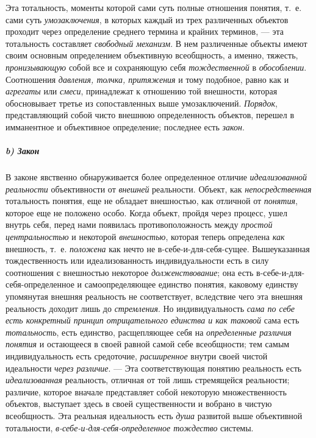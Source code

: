 \documentclass[twoside]{article}
\begin{document}
{{{Эта тотальность, моменты которой сами суть полные отношения
понятия, т.~е. сами суть
{\em умозаключения}, в
которых каждый из трех различенных объектов проходит через определение
среднего термина и крайних терминов, — эта тотальность
составляет {\em свободный механизм}.
В нем различенные объекты имеют своим основным определением
объективную всеобщность, а именно, тяжесть,
{\em пронизывающую} собой
все и сохраняющую себя
{\em тождественной} в
{\em обособлении}.
Соотношения {\em давления,
толчка, притяжения} и тому подобное, равно как и
{\em агрегаты} или
{\em смеси}, принадлежат
к отношению той внешности, которая обосновывает третье из
сопоставленных выше умозаключений.
{\em Порядок},
представляющий собой чисто внешнюю определенность объектов,
перешел в имманентное и объективное определение; последнее есть
{\em закон}.

\subparagraph[b)Закон]{b) Закон}
В законе явственно обнаруживается более определенное отличие
{\em идеализованной реальности}
объективности от
{\em внешней} реальности.
Объект, как {\em непосредственная}
тотальность понятия, еще не обладает внешностью, как отличной
от {\em понятия}, которое
еще не положено особо. Когда объект, пройдя через процесс, ушел внутрь
себя, перед нами появилась противоположность между
{\em простой центральностью}
и некоторой
{\em внешностью}, которая
теперь определена {\em как}
внешность, т.~е.
{\em положена} как нечто
не в-себе-и-для-себя-сущее. Вышеуказанная тождественность или
идеализованность индивидуальности есть в силу соотношения с внешностью
некоторое {\em долженствование};
она есть в-себе-и-для-себя-определенное и самоопределяющее
единство понятия, каковому единству упомянутая внешняя реальность не
соответствует, вследствие чего эта внешняя реальность доходит лишь до
{\em стремления}. Но
индивидуальность {\em сама по себе есть
конкретный принцип отрицательного единства и как таковой}
сама есть
{\em тотальность}, есть
единство, расщепляющее себя на
{\em определенные различия понятия}
и остающееся в своей равной самой себе всеобщности; тем самым
индивидуальность есть средоточие,
{\em расширенное} внутри
своей чистой идеальности {\em через
различие}. — Эта соответствующая понятию реальность есть
{\em идеализованная}
реальность, отличная от той лишь стремящейся реальности;
различие, которое вначале представляет собой некоторую множественность
объектов, выступает здесь в своей существенности и вобрано в чистую
всеобщность. Эта реальная идеальность есть
{\em душа} развитой выше
объективной тотальности,
{\em в-себе-и-для-себя-определенное
тождество} системы.

}}}
\end{document}
